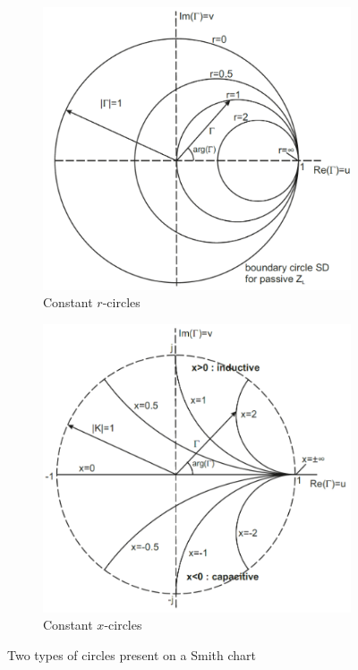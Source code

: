 \documentclass[../transmission.tex]{subfiles}
\begin{document}
				\begin{figure}[h]
					\centering
					\begin{subfigure}{.4\textwidth}
						\centering
						\includegraphics[width=1\linewidth]{../assets/chap03_r-circles.png} 
						\caption{Constant $r$-circles}
						\label{fig:chap03_r-circles}
					\end{subfigure}%
					\begin{subfigure}{.4\textwidth}
						\centering
						\includegraphics[width=1\linewidth]{../assets/chap03_x-circles.png} 
						\caption{Constant $x$-circles}
						\label{fig:chap03_x-circles}
					\end{subfigure}
					\caption{Two types of circles present on a Smith chart}
					\label{fig:circle_SD}
				\end{figure}\\
			
\end{document}
